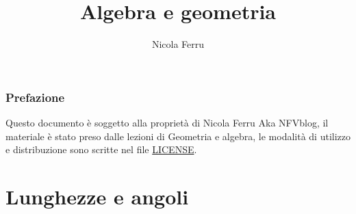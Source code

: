 \documentclass{book}
\title{Algebra e geometria}
\author{Nicola Ferru}
\theoremstyle{definition}
\theoremstyle{plain}
\begin{document}
\maketitle
\tableofcontents

\subsubsection{Prefazione}
\label{sec:pref}

Questo documento è soggetto alla proprietà di Nicola Ferru Aka NFVblog, il materiale è stato preso dalle lezioni di Geometria e algebra, le modalità di utilizzo e distribuzione sono scritte nel file \href{https://github.com/NF02/Appunti-universita/blob/main/LICENSE}{LICENSE}.


\section{Lunghezze e angoli}
\label{sec:lungeang}
\end{document}
